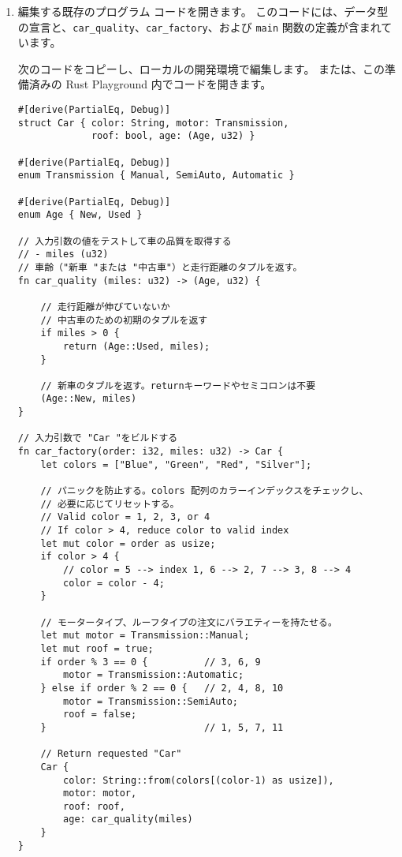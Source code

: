 \begin{enumerate}

\item 編集する既存のプログラム コードを開きます。 このコードには、データ型の宣言と、\texttt{car\_quality}、\texttt{car\_factory}、および \texttt{main} 関数の定義が含まれています。

次のコードをコピーし、ローカルの開発環境で編集します。
または、この準備済みの Rust Playground 内でコードを開きます。


\begin{lstlisting}[numbers=none]
#[derive(PartialEq, Debug)]
struct Car { color: String, motor: Transmission,
             roof: bool, age: (Age, u32) }

#[derive(PartialEq, Debug)]
enum Transmission { Manual, SemiAuto, Automatic }

#[derive(PartialEq, Debug)]
enum Age { New, Used }

// 入力引数の値をテストして車の品質を取得する
// - miles (u32)
// 車齢（"新車 "または "中古車"）と走行距離のタプルを返す。
fn car_quality (miles: u32) -> (Age, u32) {

    // 走行距離が伸びていないか
    // 中古車のための初期のタプルを返す
    if miles > 0 {
        return (Age::Used, miles);
    }

    // 新車のタプルを返す。returnキーワードやセミコロンは不要
    (Age::New, miles)
}

// 入力引数で "Car "をビルドする
fn car_factory(order: i32, miles: u32) -> Car {
    let colors = ["Blue", "Green", "Red", "Silver"];

    // パニックを防止する。colors 配列のカラーインデックスをチェックし、
    // 必要に応じてリセットする。
    // Valid color = 1, 2, 3, or 4
    // If color > 4, reduce color to valid index
    let mut color = order as usize;
    if color > 4 {        
        // color = 5 --> index 1, 6 --> 2, 7 --> 3, 8 --> 4
        color = color - 4;
    }

    // モータータイプ、ルーフタイプの注文にバラエティーを持たせる。
    let mut motor = Transmission::Manual;
    let mut roof = true;
    if order % 3 == 0 {          // 3, 6, 9
        motor = Transmission::Automatic;
    } else if order % 2 == 0 {   // 2, 4, 8, 10
        motor = Transmission::SemiAuto;
        roof = false;
    }                            // 1, 5, 7, 11

    // Return requested "Car"
    Car {
        color: String::from(colors[(color-1) as usize]),
        motor: motor,
        roof: roof,
        age: car_quality(miles)
    }
}


\end{lstlisting}
\end{enumerate}
